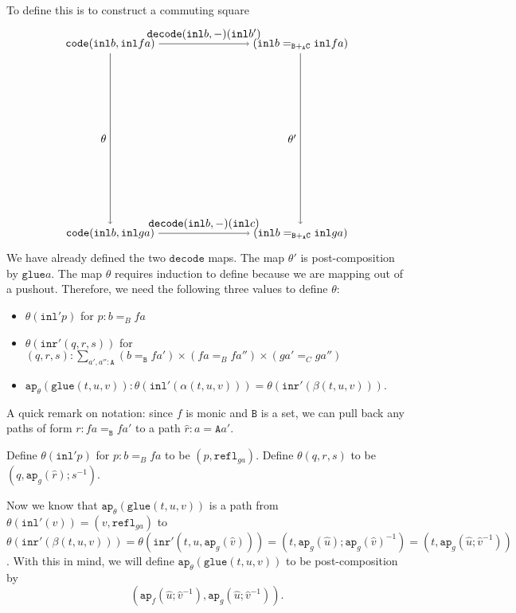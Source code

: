 \documentclass[12pt]{amsart}
\newcommand{\type}[1]{\mathtt{#1}}
\newcommand{\tin}{\colon}
\newcommand{\A}{\type{A}}
\newcommand{\B}{\type{B}}
\newcommand{\C}{\type{C}}
\newcommand{\BAC}{\B +_{\A} \C}
\newcommand{\ap}{\type{ap}}
\newcommand{\inl}{\type{inl}}
\newcommand{\inr}{\type{inr}}
\newcommand{\glue}{\type{glue}}
\newcommand{\refl}{\type{refl}}
\newcommand{\code}{\type{code}}
\newcommand{\decode}{\type{decode}}
\theoremstyle{remark}
\theoremstyle{definition}
\begin{document}
To define this is to construct a commuting square
\[
\begin{tikzpicture}
  \node (code-bb) at (-3,3) {\( \code ( \inl b , \inl fa ) \)};
  \node (code-bc) at (-3,-3) {\( \code ( \inl b , \inl ga ) \)};
  \node (id-bb) at (3,3) {\( ( \inl b =_{\BAC} \inl fa ) \)};
  \node (id-bc) at (3,-3) {\( ( \inl b =_{\BAC} \inl ga ) \)};
  \draw [->] (code-bb) to node [left] {\( \theta \)} (code-bc);
  \draw [->] (code-bb) to node [above] {\( \decode (\inl b,-)(\inl b') \)} (id-bb);
  \draw [->] (id-bb) to node [left] {\( \theta' \)} (id-bc);
  \draw [->] (code-bc) to node [above] {\( \decode (\inl b,-)(\inl c) \)} (id-bc);
\end{tikzpicture}
\]
We have already defined the two \( \decode \) maps. The map \( \theta'
\) is post-composition by \( \glue a \). The map \( \theta \) requires
induction to define because we are mapping out of a pushout.
Therefore, we need the following three values to define \( \theta \):
\begin{itemize}
\item \( \theta (\inl' p) \) for \( p \tin b=_Bfa \)
\item \( \theta ( \inr' (q,r,s) ) \) for \( (q,r,s) \tin
  \sum\limits_{a',a'' \tin \A} (b=_\B fa') \times (fa =_B fa'') \times
  (ga' =_C ga'') \) 
\item \( \ap_{ \theta } ( \glue (t,u,v) ) \tin \theta ( \inl' (\alpha
  (t,u,v) ) ) = \theta ( \inr' ( \beta (t,u,v) ) ) \).
\end{itemize}

A quick remark on notation: since \( f \) is monic and \( \B \) is a
set, we can pull back any paths of form \( r \tin fa =_\B fa'\) to a
path \( \hat{r} \tin a =\A a' \).

Define \( \theta (\inl' p) \) for \( p \tin b=_Bfa \) to
be \( ( p , \refl_{ga} ) \). Define \( \theta ( q,r,s ) \) to be \( (
q , \ap_g ( \hat{r} ) ; s^{-1} ) \).

Now we know that \( \ap_{ \theta } ( \glue ( t,u,v ) ) \) is a path from
\(\theta ( \inl' ( v ) ) = ( v , \refl_{ga} ) \) to \( \theta ( \inr'
( \beta ( t,u,v ) ) ) = \theta ( \inr' ( t,u,\ap_{g}(\hat{v}) ) ) = (
t,\ap_g ( \hat{u} ); \ap_g ( \hat{v} )^{-1} ) = ( t, \ap_g ( \hat{u} ;
\hat{v}^{-1}) ) \). With this in mind, we will define \( \ap_{\theta}
( \glue ( t,u,v ) ) \) to be post-composition by
\[
  ( \ap_f ( \hat{u};\hat{v}^{-1} ) , \ap_g ( \hat{u};\hat{v}^{-1} ) ).
\]
\end{document}
